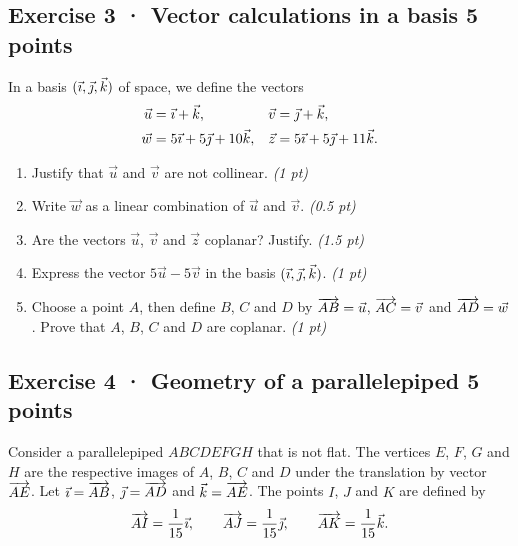 \clearpage{}\par

\subsection*{Exercise 3 · Vector calculations in a basis \hfill 5 points}In a basis $(\vec{\imath},\vec{\jmath},\vec k)$ of space, we define the vectors
\[\begin{aligned}\vec u&=\vec{\imath}+\vec k,&\vec v&=\vec{\jmath}+\vec k,\\
\vec w&=5\vec{\imath}+5\vec{\jmath}+10\vec k,&\vec z&=5\vec{\imath}+5\vec{\jmath}+11\vec k.\end{aligned}\]

\begin{enumerate}

\item Justify that $\vec u$ and $\vec v$ are not collinear. \hfill\textit{(1 pt)}

\item Write $\vec w$ as a linear combination of $\vec u$ and $\vec v$. \hfill\textit{(0.5 pt)}

\item Are the vectors $\vec u$, $\vec v$ and $\vec z$ coplanar? Justify. \hfill\textit{(1.5 pt)}

\item Express the vector $5\vec u-5\vec v$ in the basis $(\vec{\imath},\vec{\jmath},\vec k)$. \hfill\textit{(1 pt)}

\item Choose a point $A$, then define $B$, $C$ and $D$ by $\overrightarrow{AB}=\vec u$, $\overrightarrow{AC}=\vec v$ and $\overrightarrow{AD}=\vec w$. Prove that $A$, $B$, $C$ and $D$ are coplanar. \hfill\textit{(1 pt)}

\end{enumerate}

\subsection*{Exercise 4 · Geometry of a parallelepiped \hfill 5 points}Consider a parallelepiped $ABCDEFGH$ that is not flat. The vertices $E$, $F$, $G$ and $H$ are the respective images of $A$, $B$, $C$ and $D$ under the translation by vector $\overrightarrow{AE}$.
Let $\vec{\imath}=\overrightarrow{AB}$, $\vec{\jmath}=\overrightarrow{AD}$ and $\vec k=\overrightarrow{AE}$.
The points $I$, $J$ and $K$ are defined by
\[\overrightarrow{AI}=\frac1{15}\vec{\imath},\qquad\overrightarrow{AJ}=\frac1{15}\vec{\jmath},\qquad\overrightarrow{AK}=\frac1{15}\vec k.\]

